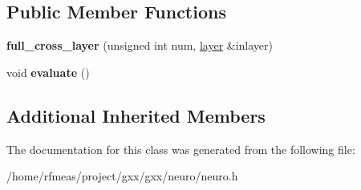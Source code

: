 \subsection*{Public Member Functions}
\begin{DoxyCompactItemize}
\item 
{\bfseries full\+\_\+cross\+\_\+layer} (unsigned int num, \hyperlink{classgxx_1_1neuro_1_1layer}{layer} \&inlayer)\hypertarget{classgxx_1_1neuro_1_1full__cross__layer_a6b8484bba92c8149818b409a9d8d7428}{}\label{classgxx_1_1neuro_1_1full__cross__layer_a6b8484bba92c8149818b409a9d8d7428}

\item 
void {\bfseries evaluate} ()\hypertarget{classgxx_1_1neuro_1_1full__cross__layer_a08a27d33cf8a47478c87cec12c25c942}{}\label{classgxx_1_1neuro_1_1full__cross__layer_a08a27d33cf8a47478c87cec12c25c942}

\end{DoxyCompactItemize}
\subsection*{Additional Inherited Members}


The documentation for this class was generated from the following file\+:\begin{DoxyCompactItemize}
\item 
/home/rfmeas/project/gxx/gxx/neuro/neuro.\+h\end{DoxyCompactItemize}

